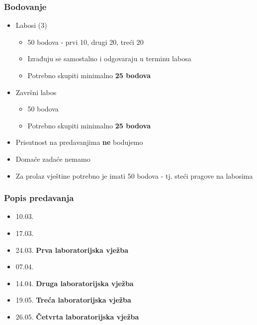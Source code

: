 \documentclass[t]{beamer}
\begin{document}
\begin{frame}
	\frametitle{Bodovanje}
	\begin{itemize}
		\item Labosi (3)
		\begin{itemize}
			\item 50 bodova - prvi 10, drugi 20, treći 20
			\item Izrađuju se samostalno i odgovaraju u terminu labosa
			\item Potrebno skupiti minimalno \textbf{25 bodova}
		\end{itemize}
		\item Završni labos
		\begin{itemize}
			\item 50 bodova
			\item Potrebno skupiti minimalno \textbf{25 bodova}
		\end{itemize}

		\item Prisutnost na predavanjima \textbf{ne} bodujemo
		\item Domaće zadaće nemamo
		\item Za prolaz vještine potrebno je imati 50 bodova - tj. steći pragove na labosima
	\end{itemize}
\end{frame}

\begin{frame}
	\frametitle{Popis predavanja}
	\begin{itemize}
		\item 10.03.
		\item 17.03.
		\item 24.03. \textbf{Prva laboratorijska vježba}
		\item 07.04.
		\item 14.04. \textbf{Druga laboratorijska vježba}
		\item 19.05. \textbf{Treća laboratorijska vježba}
		\item 26.05. \textbf{Četvrta laboratorijska vježba}
	\end{itemize}
\end{frame}
\end{document}
